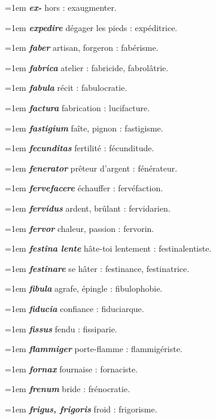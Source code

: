 \hangindent=1em \textbf{\textit{ex-}} hors : exaugmenter.\par
\hangindent=1em \textbf{\textit{expedire}} dégager les pieds : expéditrice.\par
\hangindent=1em \textbf{\textit{faber}} artisan, forgeron : fabérisme.\par
\hangindent=1em \textbf{\textit{fabrica}} atelier : fabricide, fabrolâtrie.\par
\hangindent=1em \textbf{\textit{fabula}} récit : fabulocratie.\par
\hangindent=1em \textbf{\textit{factura}} fabrication : lucifacture.\par
\hangindent=1em \textbf{\textit{fastigium}} faîte, pignon : fastigisme.\par
\hangindent=1em \textbf{\textit{fecunditas}} fertilité : fécunditude.\par
\hangindent=1em \textbf{\textit{fenerator}} prêteur d'argent : fénérateur.\par
\hangindent=1em \textbf{\textit{fervefacere}} échauffer : fervéfaction.\par
\hangindent=1em \textbf{\textit{fervidus}} ardent, brûlant : fervidarien.\par
\hangindent=1em \textbf{\textit{fervor}} chaleur, passion : fervorin.\par
\hangindent=1em \textbf{\textit{festina lente}} hâte-toi lentement : festinalentiste.\par
\hangindent=1em \textbf{\textit{festinare}} se hâter : festinance, festinatrice.\par
\hangindent=1em \textbf{\textit{fibula}} agrafe, épingle : fibulophobie.\par
\hangindent=1em \textbf{\textit{fiducia}} confiance : fiduciarque.\par
\hangindent=1em \textbf{\textit{fissus}} fendu : fissiparie.\par
\hangindent=1em \textbf{\textit{flammiger}} porte-flamme : flammigériste.\par
\hangindent=1em \textbf{\textit{fornax}} fournaise : fornaciste.\par
\hangindent=1em \textbf{\textit{frenum}} bride : frénocratie.\par
\hangindent=1em \textbf{\textit{frigus, frigoris}} froid : frigorisme.\par

